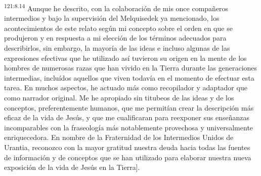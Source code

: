 \par 
\textsuperscript{121:8.14} Aunque he descrito, con la colaboración de mis once compañeros intermedios y bajo la supervisión del Melquisedek ya mencionado, los acontecimientos de este relato según mi concepto sobre el orden en que se produjeron y en respuesta a mi elección de los términos adecuados para describirlos, sin embargo, la mayoría de las ideas e incluso algunas de las expresiones efectivas que he utilizado así tuvieron su origen en la mente de los hombres de numerosas razas que han vivido en la Tierra durante las generaciones intermedias, incluídos aquellos que viven todavía en el momento de efectuar esta tarea. En muchos aspectos, he actuado más como recopilador y adaptador que como narrador original. Me he apropiado sin titubeos de las ideas y de los conceptos, preferentemente humanos, que me permitían crear la descripción más eficaz de la vida de Jesús, y que me cualificaran para reexponer sus enseñanzas incomparables con la fraseología más notablemente provechosa y universalmente enriquecedora. En nombre de la Fraternidad de los Intermedios Unidos de Urantia, reconozco con la mayor gratitud nuestra deuda hacia todas las fuentes de información y de conceptos que se han utilizado para elaborar nuestra nueva exposición de la vida de Jesús en la Tierra].